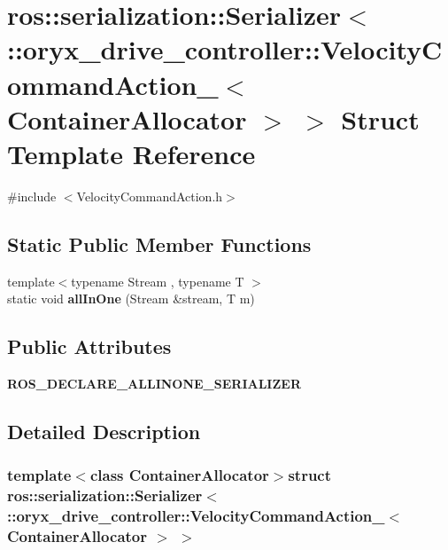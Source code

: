 \section{ros\-:\-:serialization\-:\-:\-Serializer$<$ \-:\-:oryx\-\_\-drive\-\_\-controller\-:\-:\-Velocity\-Command\-Action\-\_\-$<$ \-Container\-Allocator $>$ $>$ \-Struct \-Template \-Reference}
\label{structros_1_1serialization_1_1Serializer_3_01_1_1oryx__drive__controller_1_1VelocityCommandActio85240348fce0b112f3ee2ecf2fec4ad8}


{\ttfamily \#include $<$\-Velocity\-Command\-Action.\-h$>$}

\subsection*{\-Static \-Public \-Member \-Functions}
\begin{DoxyCompactItemize}
\item 
{\footnotesize template$<$typename Stream , typename T $>$ }\\static void {\bf all\-In\-One} (\-Stream \&stream, \-T m)
\end{DoxyCompactItemize}
\subsection*{\-Public \-Attributes}
\begin{DoxyCompactItemize}
\item 
{\bf \-R\-O\-S\-\_\-\-D\-E\-C\-L\-A\-R\-E\-\_\-\-A\-L\-L\-I\-N\-O\-N\-E\-\_\-\-S\-E\-R\-I\-A\-L\-I\-Z\-E\-R}
\end{DoxyCompactItemize}


\subsection{\-Detailed \-Description}
\subsubsection*{template$<$class Container\-Allocator$>$struct ros\-::serialization\-::\-Serializer$<$ \-::oryx\-\_\-drive\-\_\-controller\-::\-Velocity\-Command\-Action\-\_\-$<$ Container\-Allocator $>$ $>$}



